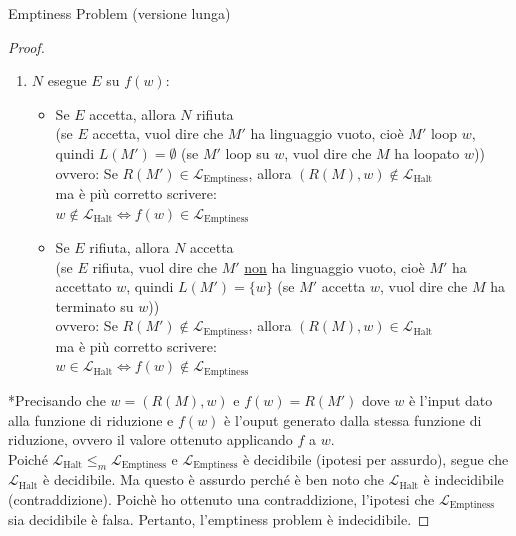 \documentclass{article}  %
\theoremstyle{definition}
\begin{document}
\begin{theorem}{Emptiness Problem (versione lunga)}
\begin{proof}
\begin{enumerate}
			\item $N$ esegue $E$ su $f(w)$:
			      \begin{itemize}
				      \item Se $E$ accetta, allora $N$ rifiuta \\
				            (se $E$ accetta, vuol dire che $M'$ ha linguaggio vuoto, cioè $M'$ loop $w$, quindi $L(M')=\emptyset$ (se $M'$ loop su $w$, vuol
				            dire che $M$ ha loopato $w$)) \\
				            ovvero: Se $R(M') \in \mathcal{L}_{\text{Emptiness}}$, allora $(R(M),w) \notin \mathcal{L}_{\text{Halt}}$ \\
				            ma è più corretto scrivere: \\
				            $w \notin \mathcal{L}_{\text{Halt}} \iff  f(w) \in \mathcal{L}_{\text{Emptiness}}$
				      \item Se $E$ rifiuta, allora $N$ accetta \\
				            (se $E$ rifiuta, vuol dire che $M'$ \underline{non} ha linguaggio vuoto, cioè $M'$ ha accettato $w$, quindi $L(M')=\{w\}$ (se $M'$ accetta $w$, vuol
				            dire che $M$ ha terminato su $w$)) \\
				            ovvero: Se $R(M') \notin \mathcal{L}_{\text{Emptiness}}$, allora $(R(M),w) \in \mathcal{L}_{\text{Halt}}$ \\
				            ma è più corretto scrivere: \\
				            $w \in \mathcal{L}_{\text{Halt}} \iff f(w) \notin \mathcal{L}_{\text{Emptiness}}$
			      \end{itemize}
		\end{enumerate}
		*Precisando che $w=(R(M),w)$ e $f(w)=R(M')$
		dove $w$ è l'input dato alla funzione di riduzione e $f(w)$ è l'ouput generato dalla stessa funzione di riduzione, ovvero il valore ottenuto applicando $f$ a $w$. \\

		Poiché $\mathcal{L}_{\text{Halt}} \leq_m \mathcal{L}_{\text{Emptiness}}$ e $\mathcal{L}_{\text{Emptiness}}$ è decidibile (ipotesi per assurdo), segue
		che $\mathcal{L}_{\text{Halt}}$ è decidibile.
		Ma questo è assurdo perché è ben noto che $\mathcal{L}_{\text{Halt}}$ è indecidibile (contraddizione). Poichè ho ottenuto una contraddizione, l'ipotesi che
		$\mathcal{L}_{\text{Emptiness}}$ sia decidibile è falsa. Pertanto, l'emptiness problem è indecidibile.
	\end{proof}
\end{theorem}
\end{document}
